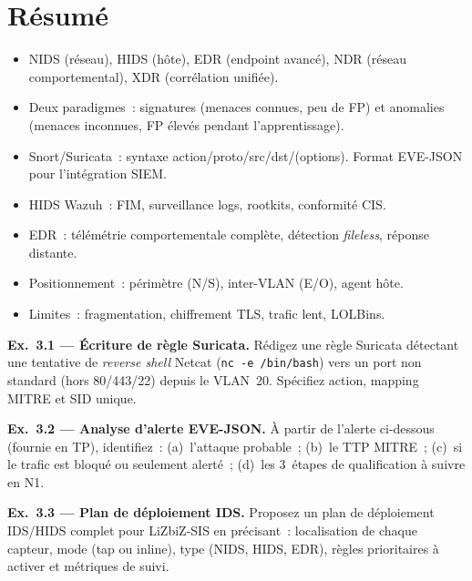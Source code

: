 \section*{Résumé}

\begin{boxresume}
\begin{itemize}
  \item NIDS (réseau), HIDS (hôte), EDR (endpoint avancé), NDR (réseau
        comportemental), XDR (corrélation unifiée).
  \item Deux paradigmes~: signatures (menaces connues, peu de FP) et
        anomalies (menaces inconnues, FP élevés pendant l'apprentissage).
  \item Snort/Suricata~: syntaxe action/proto/src/dst/(options). Format
        EVE-JSON pour l'intégration SIEM.
  \item HIDS Wazuh~: FIM, surveillance logs, rootkits, conformité CIS.
  \item EDR~: télémétrie comportementale complète, détection
        \textit{fileless}, réponse distante.
  \item Positionnement~: périmètre (N/S), inter-VLAN (E/O), agent hôte.
  \item Limites~: fragmentation, chiffrement TLS, trafic lent, LOLBins.
\end{itemize}
\end{boxresume}

\begin{boxexo}
\textbf{Ex.~3.1 — Écriture de règle Suricata.}
Rédigez une règle Suricata détectant une tentative de \textit{reverse shell}
Netcat (\texttt{nc -e /bin/bash}) vers un port non standard (hors 80/443/22)
depuis le VLAN~20. Spécifiez action, mapping MITRE et SID unique.

\medskip\textbf{Ex.~3.2 — Analyse d'alerte EVE-JSON.}
À partir de l'alerte ci-dessous (fournie en TP), identifiez~:
(a)~l'attaque probable~; (b)~le TTP MITRE~; (c)~si le trafic est bloqué
ou seulement alerté~; (d)~les 3~étapes de qualification à suivre en N1.

\medskip\textbf{Ex.~3.3 — Plan de déploiement IDS.}
Proposez un plan de déploiement IDS/HIDS complet pour LiZbiZ-SIS en
précisant~: localisation de chaque capteur, mode (tap ou inline), type
(NIDS, HIDS, EDR), règles prioritaires à activer et métriques de suivi.
\end{boxexo}
